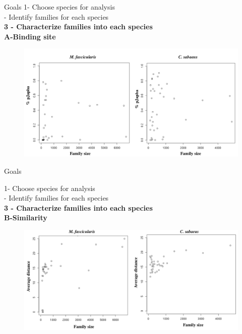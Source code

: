 \documentclass[11pt]{beamer}
\begin{document}
\begin{frame}{Goals}
	1- Choose species for analysis \\  - Identify families for each species \\ \medbreak
	\textbf{3 - Characterize families into each species} \\ \medbreak
	\textbf{A-Binding site} \\ 
		\begin{figure}
			\includegraphics[width=\textwidth]{img/jpa.png}
		\end{figure}	
			\begin{flushright}
			\tiny{\insertframenumber}
		\end{flushright}
\end{frame}	

\begin{frame}{Goals}
	
	1- Choose species for analysis \\  - Identify families for each species \\ \medbreak
	\textbf{3 - Characterize families into each species} \\ \medbreak
	\textbf{B-Similarity} \\ \medbreak
		\begin{figure}
			\includegraphics[width=\textwidth]{img/similarity_MF_CSA.png}
		\end{figure}
\end{frame}
\end{document}
